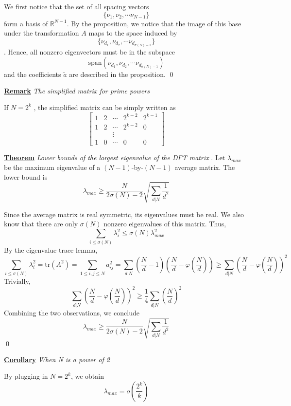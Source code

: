 \documentclass{article}
\newcommand{\new}[2]{
    \vspace{2mm}
    \noindent
    \textbf{
    \underline{#1}}
    \textit{
        {#2}
    }
    \vspace{2mm}
    \newline
}
\begin{document}
\proof We first notice that the set of all spacing vectors 
\[
    \{\nu_1, \nu_2, \cdots \nu_{N - 1}\}
\]
form a basis of $\mathbb{R}^{N-1}$. By the proposition, we notice 
that the image of this base under the transformation $A$ maps to 
the space induced by 
\[
    \{\nu_{d_1}, \nu_{d_2}, \cdots \nu_{d_{\sigma(N) - 1}}\}
\]
. Hence, all nonzero eigenvectors must be in the subspace 
\[
    \text{span}(\nu_{d_1}, \nu_{d_2}, \cdots \nu_{d_{\sigma(N) - 1}})
\]
and the coefficients $\tilde{a}$ are described in the proposition. 
\hfill \qed

\new {Remark} {The simplified matrix for prime powers}
If $N = 2^k$ , the simplified matrix can be simply 
written as 
\[
    \begin{bmatrix}
        1 & 2  & \cdots & 2^{k - 2} & 2^{k - 1} \\ 
        1 & 2 & \cdots & 2^{k - 2} & 0\\ 
        &&\vdots \\ 
        1 & 0 & \cdots &0 &0
    \end{bmatrix}
\]

\new{Theorem} {Lower bounds of the largest eigenvalue of 
the DFT matrix}. 
Let $\lambda_{max}$ be the maximum eigenvalue of a $(N-1)$-by-$(N - 1)$ 
average matrix. The lower bound is 
\[
  \lambda_{max} \geq 
  \frac N 
  {2 \sigma(N) - 2} 
  \sqrt{
    \sum_{d|N} \frac 1 {d^2}
  }
\]

\proof 
Since the average matrix is real symmetric, its eigenvalues 
must be real. We also know that there are only $\sigma(N)$ nonzero 
eigenvalues of this matrix. Thus, 
\[
 \sum_{i \leq \sigma(N)} \lambda_i^2 \leq \sigma(N)  \lambda_{max}^2
\]
By the eigenvalue trace lemma, 
\[
    \sum_{i \leq \sigma(N)} \lambda_i^2  = \text{tr}(A^2) = \sum_{1 \leq i, j \leq N} a_{ij}^2 
    = \sum_{d|N} \left(
        \frac N d - 1
    \right)\left(
        \frac N d - \varphi\left( \frac N d \right)
    \right)
    \geq \sum_{d|N} \left(
        \frac N d - \varphi\left( \frac N d \right)
    \right)^2
\]  
Trivially, 
\[
\sum_{d|N} \left(
        \frac N d - \varphi\left( \frac N d \right)
    \right)^2 \geq\frac 1 4\sum_{d|N} \left(
        \frac N d 
    \right)^2
\]
Combining the two observations, we conclude 
\[
  \lambda_{max} \geq 
  \frac N 
  {2 \sigma(N) - 2} 
  \sqrt{
    \sum_{d|N} \frac 1 {d^2}
  }
\]
\hfill \qed

\new {Corollary} {When N is a power of 2}
By plugging in $N = 2^k$, we obtain 
\[
\lambda_{max} = o\left(
    \frac {2^k} { k}
\right)
\]
\end{document}
